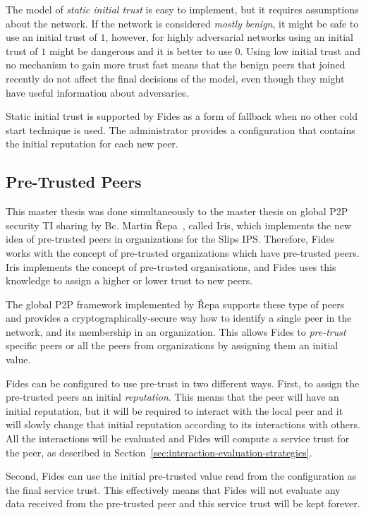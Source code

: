 The model of \textit{static initial trust} is easy to implement, but it requires assumptions about the network. If the network is considered \textit{mostly benign}, it might be safe to use an initial trust of $1$, however, for highly adversarial networks using an initial trust of $1$ might be dangerous and it is better to use $0$. 
Using low initial trust and no mechanism to gain more trust fast means that the benign peers that joined recently do not affect the final decisions of the model, even though they might have useful information about adversaries.

Static initial trust is supported by Fides as a form of fallback when no other cold start technique is used. The administrator provides a configuration that contains the initial reputation for each new peer.

\subsection{Pre-Trusted Peers}
\label{subsec:pre-trusted-peers}

This master thesis was done simultaneously to the master thesis on global P2P security TI sharing by Bc. Martin Řepa~\cite{nl}, called Iris, which implements the new idea of pre-trusted peers in organizations for the Slips IPS. Therefore, Fides works with the concept of pre-trusted organizations which have pre-trusted peers. Iris implements the concept of pre-trusted organisations, and Fides uses this knowledge to assign a higher or lower trust to new peers.

The global P2P framework implemented by Řepa supports these type of peers and provides a cryptographically-secure way how to identify a single peer in the network, and its membership in an organization.
This allows Fides to \textit{pre-trust} specific peers or all the peers from organizations by assigning them an initial value.

Fides can be configured to use pre-trust in two different ways. First, to assign the pre-trusted peers an initial \textit{reputation}. This means that the peer will have an initial reputation, but it will be required to interact with the local peer and it will slowly change that initial reputation according to its interactions with others. All the interactions will be evaluated and Fides will compute a service trust for the peer, as described in Section~\ref{sec:interaction-evaluation-strategies}. 

Second, Fides can use the initial pre-trusted value read from the configuration as the final service trust. This effectively means that Fides will not evaluate any data received from the pre-trusted peer and this service trust will be kept forever. 

